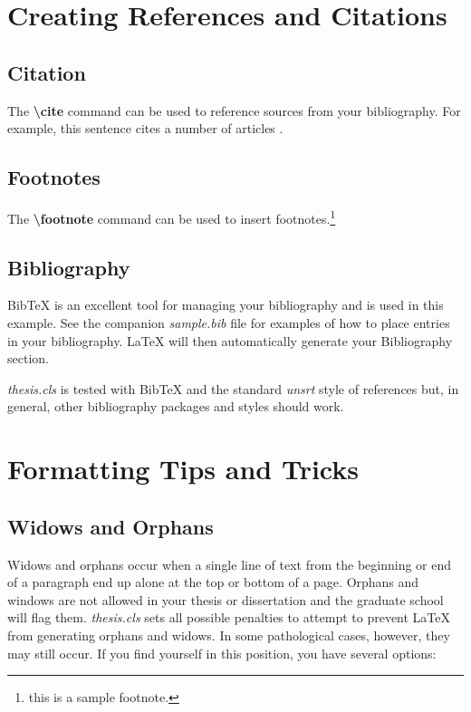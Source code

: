 \documentclass[master]{thesis}
\begin{document}
\chapter{Creating References and Citations}
\label{chap:references}

\section{Citation}

The \textbf{\textbackslash cite} command can be used to reference sources from your bibliography.  For example, this sentence cites a number of articles \cite{forney20112749, cebl, forney2011thesis, forney2015echostate, haykin2009neural}.

\section{Footnotes}

The \textbf{\textbackslash footnote} command can be used to insert footnotes.\footnote{this is a sample footnote.}

\section{Bibliography}

BibTeX is an excellent tool for managing your bibliography and is used in this example.  See the companion \textit{sample.bib} file for examples of how to place entries in your bibliography.  \LaTeX{} will then automatically generate your Bibliography section.

\textit{thesis.cls} is tested with BibTeX and the standard \textit{unsrt} style of references but, in general, other bibliography packages and styles should work.

\chapter{Formatting Tips and Tricks}
\label{chap:tips.and.tricks}

\section{Widows and Orphans}

Widows and orphans occur when a single line of text from the beginning or end of a paragraph end up alone at the top or bottom of a page.  Orphans and windows are not allowed in your thesis or dissertation and the graduate school will flag them.  \textit{thesis.cls} sets all possible penalties to attempt to prevent \LaTeX{} from generating orphans and widows.  In some pathological cases, however, they may still occur.  If you find yourself in this position, you have several options:
\end{document}
